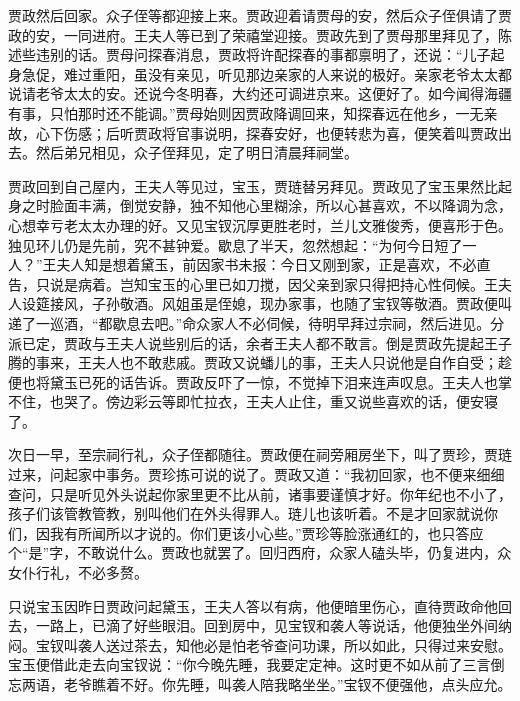 \begin{parag}
    贾政然后回家。众子侄等都迎接上来。贾政迎着请贾母的安，然后众子侄俱请了贾政的安，一同进府。王夫人等已到了荣禧堂迎接。贾政先到了贾母那里拜见了，陈述些违别的话。贾母问探春消息，贾政将许配探春的事都禀明了，还说：“儿子起身急促，难过重阳，虽没有亲见，听见那边亲家的人来说的极好。亲家老爷太太都说请老爷太太的安。还说今冬明春，大约还可调进京来。这便好了。如今闻得海疆有事，只怕那时还不能调。”贾母始则因贾政降调回来，知探春远在他乡，一无亲故，心下伤感；后听贾政将官事说明，探春安好，也便转悲为喜，便笑着叫贾政出去。然后弟兄相见，众子侄拜见，定了明日清晨拜祠堂。
\end{parag}


\begin{parag}
    贾政回到自己屋内，王夫人等见过，宝玉，贾琏替另拜见。贾政见了宝玉果然比起身之时脸面丰满，倒觉安静，独不知他心里糊涂，所以心甚喜欢，不以降调为念，心想幸亏老太太办理的好。又见宝钗沉厚更胜老时，兰儿文雅俊秀，便喜形于色。独见环儿仍是先前，究不甚钟爱。歇息了半天，忽然想起：“为何今日短了一人？”王夫人知是想着黛玉，前因家书未报：今日又刚到家，正是喜欢，不必直告，只说是病着。岂知宝玉的心里已如刀搅，因父亲到家只得把持心性伺候。王夫人设筵接风，子孙敬酒。风姐虽是侄媳，现办家事，也随了宝钗等敬酒。贾政便叫递了一巡酒，“都歇息去吧。”命众家人不必伺候，待明早拜过宗祠，然后进见。分派已定，贾政与王夫人说些别后的话，余者王夫人都不敢言。倒是贾政先提起王子腾的事来，王夫人也不敢悲戚。贾政又说蟠儿的事，王夫人只说他是自作自受；趁便也将黛玉已死的话告诉。贾政反吓了一惊，不觉掉下泪来连声叹息。王夫人也掌不住，也哭了。傍边彩云等即忙拉衣，王夫人止住，重又说些喜欢的话，便安寝了。
\end{parag}


\begin{parag}
    次日一早，至宗祠行礼，众子侄都随往。贾政便在祠旁厢房坐下，叫了贾珍，贾琏过来，问起家中事务。贾珍拣可说的说了。贾政又道：“我初回家，也不便来细细查问，只是听见外头说起你家里更不比从前，诸事要谨慎才好。你年纪也不小了，孩子们该管教管教，别叫他们在外头得罪人。琏儿也该听着。不是才回家就说你们，因我有所闻所以才说的。你们更该小心些。”贾珍等脸涨通红的，也只答应个“是”字，不敢说什么。贾政也就罢了。回归西府，众家人磕头毕，仍复进内，众女仆行礼，不必多赘。
\end{parag}


\begin{parag}
    只说宝玉因昨日贾政问起黛玉，王夫人答以有病，他便暗里伤心，直待贾政命他回去，一路上，已滴了好些眼泪。回到房中，见宝钗和袭人等说话，他便独坐外间纳闷。宝钗叫袭人送过茶去，知他必是怕老爷查问功课，所以如此，只得过来安慰。宝玉便借此走去向宝钗说：“你今晚先睡，我要定定神。这时更不如从前了三言倒忘两语，老爷瞧着不好。你先睡，叫袭人陪我略坐坐。”宝钗不便强他，点头应允。
\end{parag}


